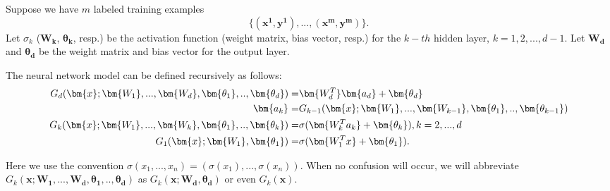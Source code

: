  Suppose we have $m$ labeled training examples 
$$\{(\bm{x^1, y^1}),...,(\bm{x^m, y^m})\}.$$ Let $\sigma_k$ ($\bm{W_k}$, $\bm{\theta_k}$, resp.) be the activation function (weight matrix, bias vector, resp.) for the $k-th$ hidden layer, $k=1,2,...,d-1$. Let $\bm{W_d}$ and $\bm{\theta_d}$ be the weight matrix and bias vector for the output layer. 

The neural network model can be defined recursively as follows:
\begin{equation}
\label{enn}
\aligned
G_d(\bm{x}; \bm{W_1},...,\bm{W_d},\bm{\theta_1},..,\bm{\theta_d}) =& \bm{W_d^T}\bm{a_d}+\bm{\theta_d}\\
\bm{a_k} =& G_{k-1}(\bm{x}; \bm{W_1},...,\bm{W_{k-1}},\bm{\theta_1},..,\bm{\theta_{k-1}})\\
G_{k}(\bm{x}; \bm{W_1},...,\bm{W_k},\bm{\theta_1},..,\bm{\theta_k})=&
\sigma(\bm{W_k^Ta_k}+\bm{\theta_k}), k=2,...,d\\
G_1(\bm{x};\bm{W_1},\bm{\theta_1})=&\sigma(\bm{W_1^Tx}+\bm{\theta_1}).
\endaligned
\end{equation}

Here we use the convention $\sigma(x_1,...,x_n) = (\sigma(x_1),...,\sigma(x_n))$. When no confusion will occur, we will abbreviate $G_k(\bm{x}; \bm{W_1},...,\bm{W_d},\bm{\theta_1},..,\bm{\theta_d})$ as $G_k(\bm{x}; \bm{W_d},\bm{\theta_d})$ or even $G_k(\bm{x})$. 



